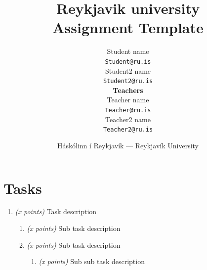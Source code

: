 \documentclass{article}
\title{Reykjavik university \\ \Huge Assignment Template}
\author{Student name \\ \texttt{Student@ru.is} \\
         Student2 name \\ \texttt{Student2@ru.is}
         \\ \textbf{Teachers} \\
         Teacher name\\ \texttt{Teacher@ru.is} \\
         Teacher2 name\\ \texttt{Teacher2@ru.is} }
\date{Háskólinn í Reykjavík --- Reykjavík University}
\begin{document}
\maketitle

\clearpage
\section{Tasks}

\begin{info}
	
\end{info}

\begin{enumerate}
    \item \textit{(x points)} Task description
    
    \begin{enumerate}
        \item \textit{(x points)} Sub task description \\
        
        \item \textit{(x points)} Sub task description
        
        \begin{enumerate}
            \item \textit{(x points)} Sub sub task description \\
                
        \end{enumerate}
    \end{enumerate}
\end{enumerate}
\end{document}

